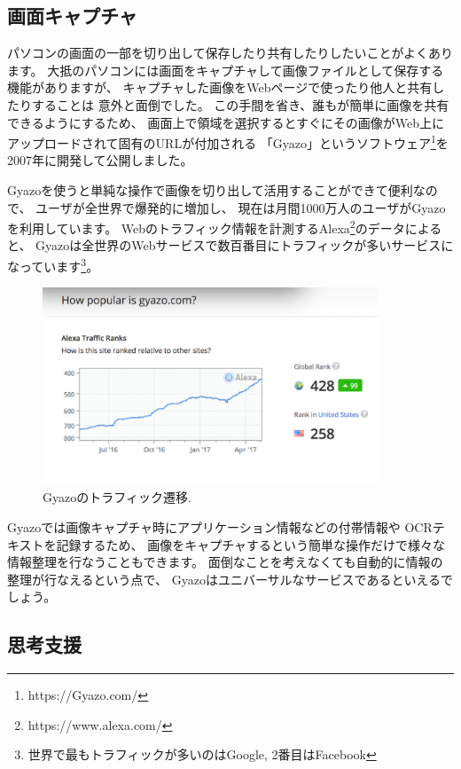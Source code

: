 \documentclass[topics]{compsoft} %
\begin{document}
\subsection{画面キャプチャ}

パソコンの画面の一部を切り出して保存したり共有したりしたいことがよくあります。
大抵のパソコンには画面をキャプチャして画像ファイルとして保存する機能がありますが、
キャプチャした画像をWebページで使ったり他人と共有したりすることは
意外と面倒でした。
この手間を省き、誰もが簡単に画像を共有できるようにするため、
画面上で領域を選択するとすぐにその画像がWeb上にアップロードされて固有のURLが付加される
「Gyazo」というソフトウェア\footnote{
  \textsf{https:{\slash}{\slash}Gyazo.com{\slash}}
}を2007年に開発して公開しました。

Gyazoを使うと単純な操作で画像を切り出して活用することができて便利なので、
ユーザが全世界で爆発的に増加し、
現在は月間1000万人のユーザがGyazoを利用しています。
%
Webのトラフィック情報を計測するAlexa\footnote{
  \textsf{https:{\slash}{\slash}www.alexa.com{\slash}}
}のデータによると、
Gyazoは全世界のWebサービスで数百番目にトラフィックが多いサービスになっています\footnote{
  世界で最もトラフィックが多いのはGoogle, 2番目はFacebook
}。

\begin{figure}[h]
  \includegraphics[width=10cm,bb=0 0 1134 668]{figures/2595e48e8346b423d6e6c1d23daf10f4.png}
  \caption{Gyazoのトラフィック遷移.}
  \label{alexa}
\end{figure}

Gyazoでは画像キャプチャ時にアプリケーション情報などの付帯情報や
OCRテキストを記録するため、
画像をキャプチャするという簡単な操作だけで様々な情報整理を行なうこともできます。
面倒なことを考えなくても自動的に情報の整理が行なえるという点で、
Gyazoはユニバーサルなサービスであるといえるでしょう。

\subsection{思考支援}
\end{document}
